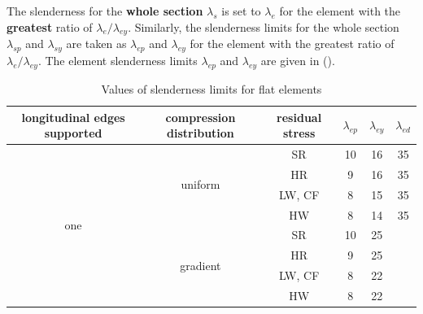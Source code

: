 The slenderness for the \textbf{whole section} $\lambda_s$ is set to $\lambda_e$ for the element with the \textbf{greatest} ratio of $\lambda_e/\lambda_{ey}$. Similarly, the slenderness limits for the whole section $\lambda_{sp}$ and $\lambda_{sy}$ are taken as $\lambda_{ep}$ and $\lambda_{ey}$ for the element with the greatest ratio of $\lambda_e/\lambda_{ey}$. The element slenderness limits $\lambda_{ep}$ and $\lambda_{ey}$ are given in  ().
\begin{table}[htbp]
\centering\footnotesize
\caption{Values of slenderness limits for flat elements}\label{tab:yield_limit}
\begin{tabular}{ccc|ccc}
	\toprule
	\parbox{2.5cm}{\centering{}longitudinal edges supported} & \parbox{2cm}{\centering{}compression distribution} &  residual stress   & $\lambda_{ep}$ & $\lambda_{ey}$ & $\lambda_{ed}$ \\ \midrule
	                {*}{one}                  &            {*}{uniform}             &         SR         &       10       &       16       &       35       \\
	                                                         &                                                    &         HR         &       9        &       16       &       35       \\
	                                                         &                                                    &       LW, CF       &       8        &       15       &       35       \\
	                                                         &                                                    &         HW         &       8        &       14       &       35       \\
	                                           &            {*}{gradient}            &         SR         &       10       &       25       &                \\
	                                                         &                                                    &         HR         &       9        &       25       &                \\
	                                                         &                                                    &       LW, CF       &       8        &       22       &                \\
	                                                         &                                                    &         HW         &       8        &       22       &                \\ \midrule

\end{tabular}
\end{table}
